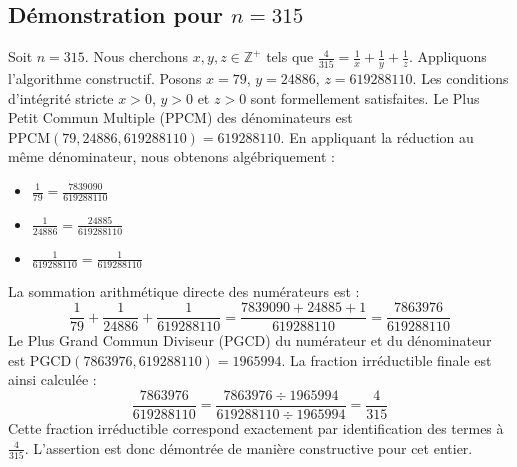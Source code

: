 \documentclass[11pt,a4paper]{article}
\begin{document}
\subsection{Démonstration pour $n = 315$}
Soit $n = 315$. Nous cherchons $x, y, z \in \mathbb{Z}^{+}$ tels que $\frac{4}{315} = \frac{1}{x} + \frac{1}{y} + \frac{1}{z}$.
Appliquons l'algorithme constructif. Posons $x = 79$, $y = 24886$, $z = 619288110$.
Les conditions d'intégrité stricte $x > 0$, $y > 0$ et $z > 0$ sont formellement satisfaites.
Le Plus Petit Commun Multiple (PPCM) des dénominateurs est $\text{PPCM}(79, 24886, 619288110) = 619288110$.
En appliquant la réduction au même dénominateur, nous obtenons algébriquement :
\begin{itemize}
    \item $\frac{1}{79} = \frac{7839090}{619288110}$
    \item $\frac{1}{24886} = \frac{24885}{619288110}$
    \item $\frac{1}{619288110} = \frac{1}{619288110}$
\end{itemize}
La sommation arithmétique directe des numérateurs est :
$$ \frac{1}{79} + \frac{1}{24886} + \frac{1}{619288110} = \frac{7839090 + 24885 + 1}{619288110} = \frac{7863976}{619288110} $$
Le Plus Grand Commun Diviseur (PGCD) du numérateur et du dénominateur est $\text{PGCD}(7863976, 619288110) = 1965994$.
La fraction irréductible finale est ainsi calculée :
$$ \frac{7863976}{619288110} = \frac{7863976 \div 1965994}{619288110 \div 1965994} = \frac{4}{315} $$
Cette fraction irréductible correspond exactement par identification des termes à $\frac{4}{315}$. L'assertion est donc démontrée de manière constructive pour cet entier.
\end{document}
